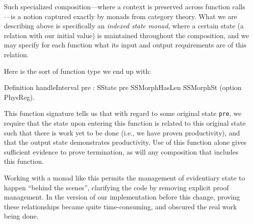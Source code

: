 \documentclass{llncs}
\newif\ifdraft\drafttrue  %
\newenvironment{MyCoqExampleStar}{\small \verbatim}{\endverbatim \normalsize}
\newcommand{\xcomment}[3]{\ifdraft\textcolor{#1}{[#2: #3]}\else\fi}
\newcommand{\gts}[1]{\xcomment{OliveGreen}{GTS}{#1}}
\begin{document}
Such specialized composition---where a context is preserved across function
calls---is a notion captured exactly by monads from category theory.  What we
are describing above is specifically an \emph{indexed state monad}, where a
certain state (a relation with our initial value) is maintained throughout the
composition, and we may specify for each function what its input and output
requirements are of this relation.

Here is the sort of function type we end up with:

\begin{MyCoqExampleStar}
Definition handleInterval {pre}
  : SState pre SSMorphHasLen SSMorphSt (option PhysReg).
\end{MyCoqExampleStar}






This function signature tells us that with regard to some original state
\texttt{pre}, we require that the state upon entering this function is related
to this original state such that there is work yet to be done (i.e., we have
proven productivity), and that the output state demonstrates productivity.
Use of this function alone gives sufficient evidence to prove termination, as
will any composition that includes this function.

Working with a monad like this permits the management of evidentiary state to
happen ``behind the scenes'', clarifying the code by removing explicit proof
management.  In the version of our implementation before this change, proving
these relationships became quite time-consuming, and obscured the real work
being done.
\end{document}
